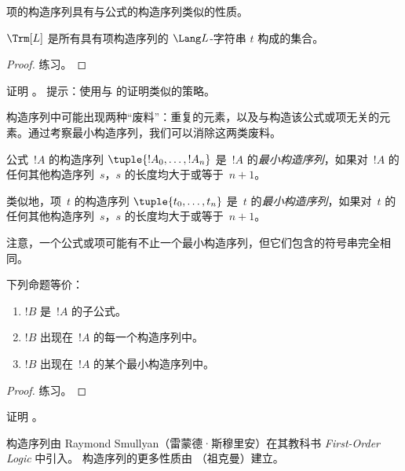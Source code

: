 \documentclass[../../../include/open-logic-section]{subfiles}
\begin{document}
项的构造序列具有与公式的构造序列类似的性质。

\begin{prop}
$\Trm[L]$ 是所有具有项构造序列的 $\Lang L$-字符串 $t$ 构成的集合。
\end{prop}

\begin{proof}
练习。
\end{proof}

\begin{prob}
证明 。
提示：使用与  的证明类似的策略。
\end{prob}

构造序列中可能出现两种“废料”：重复的元素，以及与构造该公式或项无关的元素。通过考察最小构造序列，我们可以消除这两类废料。

\begin{defn}[最小构造序列]
公式~$!A$ 的构造序列 $\tuple{!A_0, \ldots, !A_n}$ 是~$!A$ 的\emph{最小构造序列}，如果对~$!A$ 的任何其他构造序列~$s$，$s$ 的长度均大于或等于~$n+1$。

类似地，项~$t$ 的构造序列 $\tuple{t_0, \ldots, t_n}$ 是~$t$ 的\emph{最小构造序列}，如果对~$t$ 的任何其他构造序列~$s$，$s$ 的长度均大于或等于~$n+1$。
\end{defn}

注意，一个公式或项可能有不止一个最小构造序列，但它们包含的符号串完全相同。

\begin{prop}
下列命题等价：
\begin{enumerate}
    \item $!B$ 是~$!A$ 的子公式。
    \item $!B$ 出现在~$!A$ 的每一个构造序列中。
    \item $!B$ 出现在~$!A$ 的某个最小构造序列中。
\end{enumerate}
\end{prop}

\begin{proof}
练习。
\end{proof}

\begin{prob}
证明 。
\end{prob}

\begin{history}
构造序列由 Raymond Smullyan（雷蒙德·斯穆里安）在其教科书 \emph{First-Order Logic} \citep{Smullyan1968} 中引入。
构造序列的更多性质由 \citet{Zuckerman1973}（祖克曼）建立。
\end{history}
\end{document}
